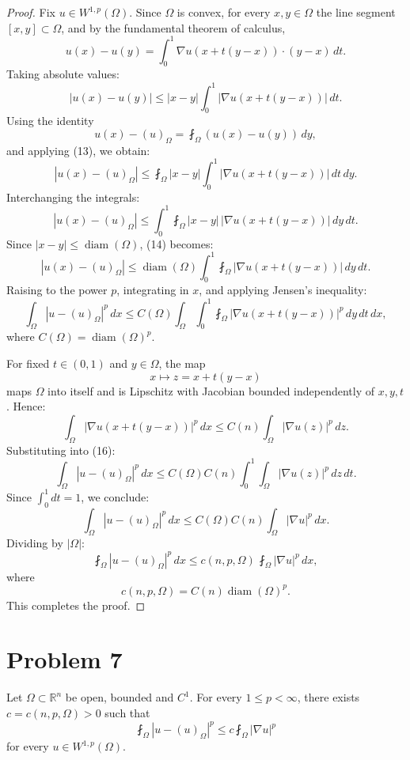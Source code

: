\begin{proof}
Fix $u \in W^{1,p}(\Omega)$. Since $\Omega$ is convex, for every $x,y \in \Omega$ the line segment $[x,y] \subset \Omega$, and by the fundamental theorem of calculus,
\[
u(x)-u(y)= \int_0^1 \nabla u(x+t(y-x)) \cdot (y-x)\, dt.
\]
Taking absolute values:
\[
|u(x)-u(y)|
\le |x-y| \int_0^1 |\nabla u(x+t(y-x))| \, dt.
\tag{13}
\]
Using the identity
\[
u(x)-(u)_\Omega = \fint_\Omega (u(x)-u(y))\, dy,
\]
and applying (13), we obtain:
\[
|u(x)-(u)_\Omega|
\le \fint_\Omega |x-y| \int_0^1 |\nabla u(x+t(y-x))| \, dt \, dy.
\]
Interchanging the integrals:
\[
|u(x)-(u)_\Omega|
\le \int_0^1 \fint_\Omega |x-y|\,|\nabla u(x+t(y-x))| \, dy \, dt.
\tag{14}
\]
Since $|x-y| \le \operatorname{diam}(\Omega)$, (14) becomes:
\[
|u(x)-(u)_\Omega|
\le \operatorname{diam}(\Omega)
\int_0^1 \fint_\Omega |\nabla u(x+t(y-x))| \, dy \, dt.
\tag{15}
\]
Raising to the power $p$, integrating in $x$, and applying Jensen's inequality:
\[
\int_\Omega |u-(u)_\Omega|^p \, dx
\le C(\Omega)
\int_\Omega \int_0^1 \fint_\Omega 
|\nabla u(x+t(y-x))|^p \, dy \, dt \, dx,
\tag{16}
\]
where $C(\Omega) = \operatorname{diam}(\Omega)^p$.

For fixed $t \in (0,1)$ and $y \in \Omega$, the map
\[
x \mapsto z = x+t(y-x)
\]
maps $\Omega$ into itself and is Lipschitz with Jacobian bounded independently of $x,y,t$. Hence:
\[
\int_\Omega |\nabla u(x+t(y-x))|^p \, dx
\le C(n) \int_\Omega |\nabla u(z)|^p \, dz.
\]
Substituting into (16):
\[
\int_\Omega |u-(u)_\Omega|^p \, dx
\le C(\Omega)C(n)
\int_0^1 \int_\Omega |\nabla u(z)|^p \, dz \, dt.
\]
Since $\int_0^1 dt = 1$, we conclude:
\[
\int_\Omega |u-(u)_\Omega|^p \, dx
\le C(\Omega)C(n)
\int_\Omega |\nabla u|^p \, dx.
\]
Dividing by $|\Omega|$:
\[
\fint_\Omega |u-(u)_\Omega|^p \, dx
\le c(n,p,\Omega)\, \fint_\Omega |\nabla u|^p \, dx,
\]
where
\[
c(n,p,\Omega) = C(n)\operatorname{diam}(\Omega)^p.
\]
This completes the proof.
\end{proof}

\section{Problem 7}
\begin{theorem}
    Let $\Omega\subset \mathbb{R}^n$ be open, bounded and $C^1$. For every $1\le p< \infty$, there exists $c=c(n, p, \Omega)>0$ such that 
    \[
    \fint_\Omega |u-(u)_\Omega|^p \le c\fint_\Omega |\nabla u|^p
    \]
    for every $u\in W^{1,p}(\Omega)$.
\end{theorem}

